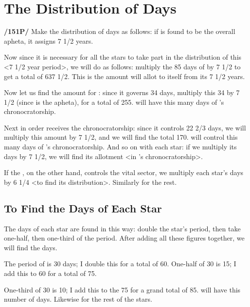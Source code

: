 \section{The Distribution of Days}
\textbf{/151P/} Make the distribution of days as follows: if \Saturn\xspace is found to be the overall apheta, it assigns 7 1/2 years.

Now since it is necessary for all the stars to take part in the distribution of this <7 1/2 year period>, we will do as follows: multiply the 85 days of \Saturn\xspace by 7 1/2 to get a total of 637 1/2. This is the amount \Saturn\xspace will allot to itself from its 7 1/2 years. 

Now let us find the amount for \Jupiter: since it governs 34 days, multiply this 34 by 7 1/2 (since \Saturn\xspace is the apheta), for a total of 255. \Jupiter\xspace will have this many days of \Saturn’s chronocratorship. 

Next in order \Venus\xspace receives the chronocratorship: since
it controls 22 2/3 days, we will multiply this amount by 7 1/2, and we will find the total 170. \Venus\xspace will control this many days of \Saturn’s chronocratorship. And so on with each star: if we multiply its days by 7 1/2, we will find its allotment <in \Saturn’s chronocratorship>. 

If the \Moon, on the other hand, controls the vital sector, we multiply each star’s days by 6 1/4 <to find its distribution>. Similarly for the rest.

\subsection{To Find the Days of Each Star}

The days of each star are found in this way: double the star’s period, then take one-half, then one-third of the period. 
After adding all these figures together, we will find the days. 

The period of \Saturn\xspace is 30 days; I double this for a total of 60. One-half of 30 is 15; I add this to 60 for a total of 75. 

One-third of 30 is 10; I add this to the 75 for a grand total of 85. \Saturn\xspace will have this number of days. Likewise for the rest of the stars.

\newpage